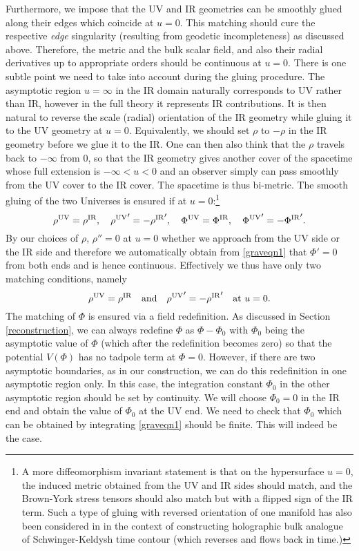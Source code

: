 \documentclass[prd,reprint,a4paper,showpacs,superscriptaddress,11pt,onecolumn,nofootinbib]{revtex4-1}
\renewcommand{\(}{\left(}
\renewcommand{\)}{\right)}
\newcommand{\6}{\partial}
\begin{document}
Furthermore, we impose that the UV and IR geometries can be smoothly glued along their edges which coincide at $u=0$. This matching should cure the respective \textit{edge} singularity (resulting from geodetic incompleteness) as discussed above. Therefore, the metric and the bulk scalar field, and also their radial derivatives up to appropriate orders should be continuous at $u= 0$. There is one subtle point we need to take into account during the gluing procedure. The asymptotic region $u = \infty$ in the IR domain naturally corresponds to UV rather than IR, however in the full theory it represents IR contributions. It is then natural to reverse the scale (radial) orientation of the IR geometry while gluing it to the UV geometry at $u=0$. Equivalently, we should set $\rho$ to $-\rho$ in the IR geometry before we glue it to the IR. One can then also think that the $\rho$ travels back to $-\infty$ from $0$, so that the IR geometry gives another cover of the spacetime whose full extension is $-\infty < u <0$ and an observer simply can pass smoothly from the UV cover to the IR cover. The spacetime is thus bi-metric. The smooth gluing of the two Universes is ensured if at $u = 0$:\footnote{A more diffeomorphism invariant statement is that on the hypersurface $u=0$, the induced metric obtained from the UV and IR sides should match, and the Brown-York stress tensors should also match but with a flipped sign of the IR term. Such a type of gluing with reversed orientation of one manifold has also been considered in \cite{Skenderis:2008dg} in the context of constructing holographic bulk analogue of Schwinger-Keldysh time contour (which reverses and flows back in time.)}
\begin{equation}
\rho^{\rm UV} = \rho^{\rm IR}, \quad {\rho^{\rm UV}}' = -{\rho^{\rm IR}}', \quad \Phi^{\rm UV} = \Phi^{\rm IR}, \quad {\Phi^{\rm UV}}' = -{\Phi^{\rm IR}}'.
\end{equation}
By our choices of $\rho$, $\rho'' = 0$ at $u= 0$ whether we approach from the UV side or the IR side and therefore we automatically obtain from \eqref{graveqn1} that $\Phi' = 0$ from both ends and is hence continuous. Effectively we thus have only two matching conditions, namely
\begin{equation}\label{matching}
\rho^{\rm UV} = \rho^{\rm IR}\quad \text{and} \quad{\rho^{\rm UV}}' = -{\rho^{\rm IR}}' \quad \text{at $u=0$.}
\end{equation}
The matching of $\Phi$ is ensured via a field redefinition. As discussed in Section \ref{reconstruction}, we can always redefine $\Phi$ as $\Phi - \Phi_0$ with $\Phi_0$ being the asymptotic value of $\Phi$  (which after the redefinition becomes zero) so that the potential $V(\Phi)$ has no tadpole term at $\Phi = 0$. However, if there are two asymptotic boundaries, as in our construction, we can do this redefinition in one asymptotic region only. In this case, the integration constant $\Phi_0$ in the other asymptotic region should be set by continuity. We will choose $\Phi_0 = 0$ in the IR end and obtain the value of $\Phi_0$ at the UV end. We need to check that $\Phi_0$ which can be obtained by integrating \eqref{graveqn1} should be finite. This will indeed be the case.
\end{document}
